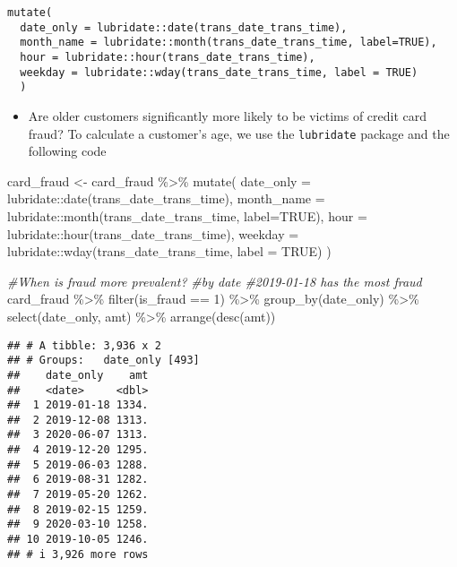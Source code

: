 \documentclass[
]{article}
\newenvironment{Shaded}{\begin{snugshade}}{\end{snugshade}}
\newcommand{\AttributeTok}[1]{\textcolor[rgb]{0.77,0.63,0.00}{#1}}
\newcommand{\CommentTok}[1]{\textcolor[rgb]{0.56,0.35,0.01}{\textit{#1}}}
\newcommand{\ConstantTok}[1]{\textcolor[rgb]{0.00,0.00,0.00}{#1}}
\newcommand{\DecValTok}[1]{\textcolor[rgb]{0.00,0.00,0.81}{#1}}
\newcommand{\FunctionTok}[1]{\textcolor[rgb]{0.00,0.00,0.00}{#1}}
\newcommand{\NormalTok}[1]{#1}
\newcommand{\OtherTok}[1]{\textcolor[rgb]{0.56,0.35,0.01}{#1}}
\newcommand{\SpecialCharTok}[1]{\textcolor[rgb]{0.00,0.00,0.00}{#1}}
\providecommand{\tightlist}{%
  \setlength{\itemsep}{0pt}\setlength{\parskip}{0pt}}
\begin{document}
\begin{verbatim}
mutate(
  date_only = lubridate::date(trans_date_trans_time),
  month_name = lubridate::month(trans_date_trans_time, label=TRUE),
  hour = lubridate::hour(trans_date_trans_time),
  weekday = lubridate::wday(trans_date_trans_time, label = TRUE)
  )
\end{verbatim}

\begin{itemize}
\tightlist
\item
  Are older customers significantly more likely to be victims of credit
  card fraud? To calculate a customer's age, we use the
  \texttt{lubridate} package and the following code
\end{itemize}

\begin{Shaded}
\begin{Highlighting}[]
\NormalTok{card\_fraud }\OtherTok{\textless{}{-}}\NormalTok{ card\_fraud }\SpecialCharTok{\%\textgreater{}\%} 
  \FunctionTok{mutate}\NormalTok{(}
  \AttributeTok{date\_only =}\NormalTok{ lubridate}\SpecialCharTok{::}\FunctionTok{date}\NormalTok{(trans\_date\_trans\_time),}
  \AttributeTok{month\_name =}\NormalTok{ lubridate}\SpecialCharTok{::}\FunctionTok{month}\NormalTok{(trans\_date\_trans\_time, }\AttributeTok{label=}\ConstantTok{TRUE}\NormalTok{),}
  \AttributeTok{hour =}\NormalTok{ lubridate}\SpecialCharTok{::}\FunctionTok{hour}\NormalTok{(trans\_date\_trans\_time),}
  \AttributeTok{weekday =}\NormalTok{ lubridate}\SpecialCharTok{::}\FunctionTok{wday}\NormalTok{(trans\_date\_trans\_time, }\AttributeTok{label =} \ConstantTok{TRUE}\NormalTok{)}
\NormalTok{  )}

\CommentTok{\#When is fraud more prevalent? }
\CommentTok{\#by date \#2019{-}01{-}18 has the most fraud}
\NormalTok{card\_fraud }\SpecialCharTok{\%\textgreater{}\%} 
  \FunctionTok{filter}\NormalTok{(is\_fraud }\SpecialCharTok{==} \DecValTok{1}\NormalTok{) }\SpecialCharTok{\%\textgreater{}\%} 
  \FunctionTok{group\_by}\NormalTok{(date\_only) }\SpecialCharTok{\%\textgreater{}\%}
  \FunctionTok{select}\NormalTok{(date\_only, amt) }\SpecialCharTok{\%\textgreater{}\%} 
  \FunctionTok{arrange}\NormalTok{(}\FunctionTok{desc}\NormalTok{(amt))}
\end{Highlighting}
\end{Shaded}

\begin{verbatim}
## # A tibble: 3,936 x 2
## # Groups:   date_only [493]
##    date_only    amt
##    <date>     <dbl>
##  1 2019-01-18 1334.
##  2 2019-12-08 1313.
##  3 2020-06-07 1313.
##  4 2019-12-20 1295.
##  5 2019-06-03 1288.
##  6 2019-08-31 1282.
##  7 2019-05-20 1262.
##  8 2019-02-15 1259.
##  9 2020-03-10 1258.
## 10 2019-10-05 1246.
## # i 3,926 more rows
\end{verbatim}
\end{document}
